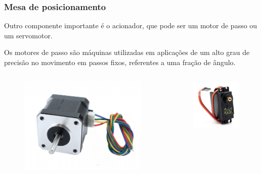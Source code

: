 \begin{frame}
\frametitle{Mesa de posicionamento}

Outro componente importante é o acionador, que pode ser um motor de passo ou um servomotor. 

Os motores de passo são máquinas utilizadas em aplicações de um alto grau de precisão no movimento em passos fixos, referentes a uma fração de ângulo. 

\begin{columns}
        \begin{figure}
        \centering
        \includegraphics[scale = 0.07]{figuras/motordepassoex}
        \end{figure}
        \begin{figure}
        \centering
        \includegraphics[scale = 0.13]{figuras/servomotorex}
        \end{figure}
\end{columns}

\end{frame}

